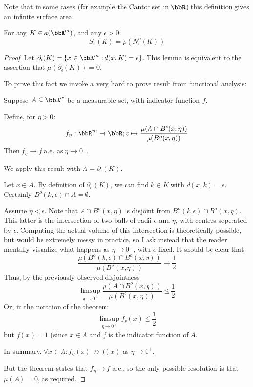 \documentclass[a4paper,11pt]{article}
\begin{document}
Note that in some cases (for example the Cantor set in $\bbR$) this definition
gives an infinite surface area.

\begin{lemma}
\label{thm:openNeighbourhoods}
For any $K\in\kappa(\bbR^m)$, and any $\epsilon>0$:
\[
S_\epsilon(K)=\mu(N_\epsilon^o(K))
\]
\end{lemma}

\begin{proof}
Let $\partial_\epsilon(K)=\{x\in\bbR^m:d(x,K)=\epsilon\}$.  This lemma is
equivalent to the assertion that $\mu(\partial_\epsilon(K))=0$.

To prove this fact we invoke a very hard to prove result from functional
analysis:

\begin{thm}
Suppose $A\subseteq\bbR^m$ be a measurable set, with indicator function $f$.

Define, for $\eta>0$:
\[
f_\eta:\bbR^m\to\bbR;x\mapsto\frac{\mu(A\cap B^o(x,\eta))}{\mu(B^o(x,\eta))}
\]
Then $f_\eta\to f$ a.e. as $\eta\to0^+$.
\end{thm}

We apply this result with $A=\partial_\epsilon(K)$.

Let $x\in A$.  By definition of $\partial_\epsilon(K)$, we can find $k\in K$
with $d(x,k)=\epsilon$.  Certainly $B^o(k,\epsilon)\cap A=\emptyset$.

Assume $\eta<\epsilon$.  Note that $A\cap B^o(x,\eta)$ is disjoint from
$B^o(k,\epsilon)\cap B^o(x,\eta)$.  This latter is the intersection of two
balls of radii $\epsilon$ and $\eta$, with centres seperated by $\epsilon$.
Computing the actual volume of this intersection is theoretically possible, but
would be extremely messy in practice, so I ask instead that the reader
mentally visualize what happens as $\eta\to0^+$, with $\epsilon$ fixed.
It should be clear that
\[
\frac{\mu(B^o(k,\epsilon)\cap B^o(x,\eta))}{\mu(B^o(x,\eta))}\to\frac{1}{2}
\]
Thus, by the previously observed disjointness
\[
\limsup_{\eta\to0^+}\frac{\mu(A\cap B^o(x,\eta))}{\mu(B^o(x,\eta))}
  \leq\frac{1}{2}
\]
Or, in the notation of the theorem:
\[
\limsup_{\eta\to0^+}f_\eta(x)\leq\frac{1}{2}
\]
but $f(x)=1$ (since $x\in A$ and $f$ is the indicator function of $A$.

In summary, $\forall x\in A:f_\eta(x)\not\to f(x)$ as $\eta\to0^+$.

But the theorem states that $f_\eta\to f$ a.e., so the only possible resolution
is that $\mu(A)=0$, as required.
\end{proof}
\end{document}
